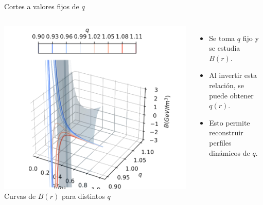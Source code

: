 \documentclass{beamer}
\begin{document}
\begin{frame}{Cortes a valores fijos de \( q \)}
  \begin{columns}
    \includegraphics[width=\linewidth]{figures/B(r)-different-q.png}
    \vspace{0.1cm}
    \centering \scriptsize{Curvas de \( B(r) \) para distintos \( q \)}

    \begin{itemize}
      \item Se toma \( q \) fijo y se estudia \( B(r) \).
      \item Al invertir esta relación, se puede obtener \( q(r) \).
      \item Esto permite reconstruir perfiles dinámicos de \( q \).
    \end{itemize}
  \end{columns}
\end{frame}
\end{document}
